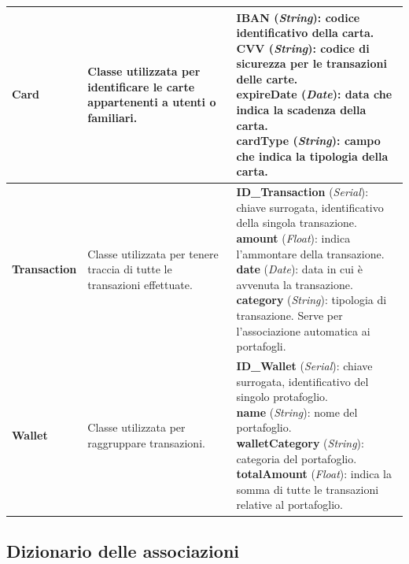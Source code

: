 \begin{longtable}{m{2.7cm}|m{4cm}|m{7cm}}
    \textbf{Card} & \raggedright Classe utilizzata per identificare le carte appartenenti a utenti o familiari. &
    \parbox{7cm}{
        \textbf{IBAN} (\textit{String}): codice identificativo della carta. \\
        \textbf{CVV} (\textit{String}): codice di sicurezza per le transazioni delle carte. \\
        \textbf{expireDate} (\textit{Date}): data che indica la scadenza della carta. \\
        \textbf{cardType} (\textit{String}): campo che indica la tipologia della carta.
    } \\ \hline

    \textbf{Transaction} & \raggedright Classe utilizzata per tenere traccia di tutte le transazioni effettuate. &
    \parbox{7cm}{
        \textbf{ID\_Transaction} (\textit{Serial}): chiave surrogata, identificativo della singola transazione. \\
        \textbf{amount} (\textit{Float}): indica l'ammontare della transazione. \\
        \textbf{date} (\textit{Date}): data in cui è avvenuta la transazione. \\
        \textbf{category} (\textit{String}): tipologia di transazione. Serve per l'associazione automatica ai portafogli.
    } \\ \hline

    \textbf{Wallet} & \raggedright Classe utilizzata per raggruppare transazioni. &
    \parbox{7cm}{
        \textbf{ID\_Wallet} (\textit{Serial}): chiave surrogata, identificativo del singolo protafoglio. \\
        \textbf{name} (\textit{String}): nome del portafoglio. \\
        \textbf{walletCategory} (\textit{String}): categoria del portafoglio. \\
        \textbf{totalAmount} (\textit{Float}): indica la somma di tutte le transazioni relative al portafoglio.
    } \\ \hline

\end{longtable}

\subsection{Dizionario delle associazioni}

